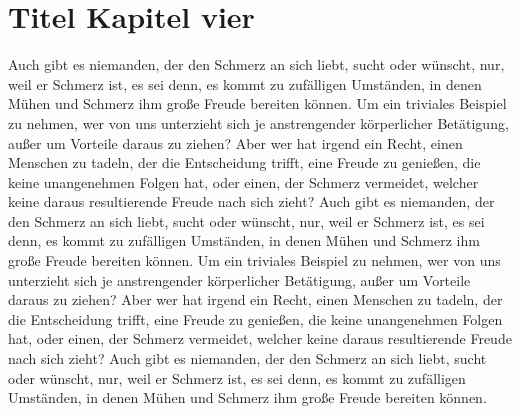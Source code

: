 \documentclass[12pt]{report}
\begin{document}
\chapter{Titel Kapitel vier}
Auch gibt es niemanden, der den Schmerz an sich liebt, sucht oder wünscht, nur, weil er Schmerz ist,
es sei denn, es kommt zu zufälligen Umständen, in denen Mühen und Schmerz ihm große Freude bereiten
können. Um ein triviales Beispiel zu nehmen, wer von uns unterzieht sich je anstrengender körperlicher
Betätigung, außer um Vorteile daraus zu ziehen? Aber wer hat irgend ein Recht, einen Menschen zu
tadeln, der die Entscheidung trifft, eine Freude zu genießen, die keine unangenehmen Folgen hat,
oder einen, der Schmerz vermeidet, welcher keine daraus resultierende Freude nach sich zieht?
Auch gibt es niemanden, der den Schmerz an sich liebt, sucht oder wünscht, nur, weil er Schmerz ist,
es sei denn, es kommt zu zufälligen Umständen, in denen Mühen und Schmerz ihm große Freude bereiten
können. Um ein triviales Beispiel zu nehmen, wer von uns unterzieht sich je anstrengender körperlicher
Betätigung, außer um Vorteile daraus zu ziehen? Aber wer hat irgend ein Recht, einen Menschen zu
tadeln, der die Entscheidung trifft, eine Freude zu genießen, die keine unangenehmen Folgen hat,
oder einen, der Schmerz vermeidet, welcher keine daraus resultierende Freude nach sich zieht? Auch
gibt es niemanden, der den Schmerz an sich liebt, sucht oder wünscht, nur, weil er Schmerz ist, es
sei denn, es kommt zu zufälligen Umständen, in denen Mühen und Schmerz ihm große Freude bereiten
können.
\end{document}
